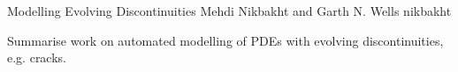               {Modelling Evolving Discontinuities}
              {Mehdi Nikbakht and Garth N. Wells}
              {nikbakht}

Summarise work on automated modelling of PDEs with evolving
discontinuities, e.g. cracks.
